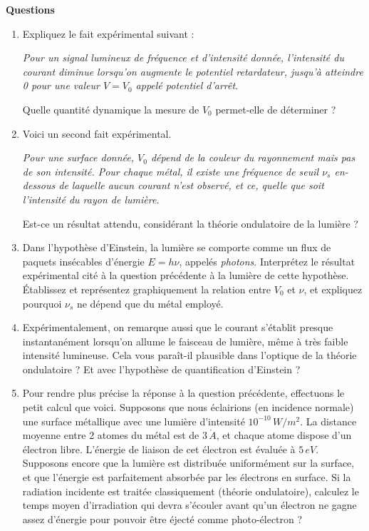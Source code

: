 \textbf{Questions} \\
\begin{enumerate}
\item Expliquez le fait expérimental suivant : 
\begin{center}
\textit{Pour un signal lumineux de fréquence et d'intensité donnée, l'intensité du courant diminue lorsqu'on augmente le potentiel retardateur, jusqu'à atteindre 0 pour une valeur $V=V_0$ appelé \emph{potentiel d'arrêt}}.
\end{center}
Quelle quantité dynamique la mesure de $V_0$ permet-elle de déterminer ?
\item Voici un second fait expérimental.
\begin{center}
\textit{Pour une surface donnée, $V_0$ dépend de la couleur du rayonnement mais \emph{pas} de son intensité. Pour chaque métal, il existe une fréquence de seuil $\nu_s$ en-dessous de laquelle aucun courant n'est observé, et ce, quelle que soit l'intensité du rayon de lumière.}
\end{center}
Est-ce un résultat attendu, considérant la théorie ondulatoire de la lumière ?
\item Dans l'hypothèse d'Einstein, la lumière se comporte comme un flux de paquets insécables d'énergie $E=h\nu$, appelés \textit{photons}. Interprétez le résultat expérimental cité à la question précédente à la lumière de cette hypothèse.
Établissez et représentez graphiquement la relation entre $V_0$ et $\nu$, et expliquez pourquoi $\nu_s$ ne dépend que du métal employé.
\item Expérimentalement, on remarque aussi que le courant s'établit presque instantanément lorsqu'on allume le faisceau de lumière, même à très faible intensité lumineuse. Cela vous paraît-il plausible dans l'optique de la théorie ondulatoire ? Et avec l'hypothèse de quantification d'Einstein ?
\item Pour rendre plus précise la réponse à la question précédente, effectuons le petit calcul que voici. Supposons que nous éclairions (en incidence normale) une surface métallique avec une lumière d'intensité $10^{-10}\, W/m^2$. La distance moyenne entre 2 atomes du métal est de $3 \,\mathring{A}$, et chaque atome dispose d'un électron libre. L'énergie de liaison de cet électron est évaluée à $5 \, eV$. Supposons encore que la lumière est distribuée uniformément sur la surface, et que l'énergie est parfaitement absorbée par les électrons en surface. Si la radiation incidente est traitée classiquement (théorie ondulatoire), calculez le temps moyen d'irradiation qui devra s'écouler avant qu'un électron ne gagne assez d'énergie pour pouvoir être éjecté comme photo-électron ?
\end{enumerate}

